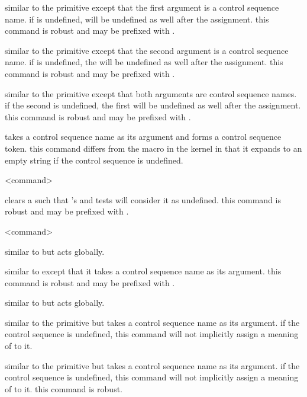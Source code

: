 \begin{ltxsyntax}
similar to the \tex primitive  except that the first argument is a control sequence name. if  is undefined,  will be undefined as well after the assignment. this command is robust and may be prefixed with .


similar to the \tex primitive  except that the second argument is a control sequence name. if  is undefined, the  will be undefined as well after the assignment. this command is robust and may be prefixed with .


similar to the \tex primitive  except that both arguments are control sequence names. if the second  is undefined, the first  will be undefined as well after the assignment. this command is robust and may be prefixed with .


takes a control sequence name as its argument and forms a control sequence token. this command differs from the  macro in the \latex kernel in that it expands to an empty string if the control sequence is undefined.

<command>

clears a  such that \etex's  and  tests will consider it as undefined. this command is robust and may be prefixed with .

<command>

similar to  but acts globally.


similar to  except that it takes a control sequence name as its argument. this command is robust and may be prefixed with .


similar to  but acts globally.


similar to the \tex primitive  but takes a control sequence name as its argument. if the control sequence is undefined, this command will not implicitly assign a meaning of  to it.


similar to the \tex primitive  but takes a control sequence name as its argument. if the control sequence is undefined, this command will not implicitly assign a meaning of  to it. this command is robust.

\end{ltxsyntax}

